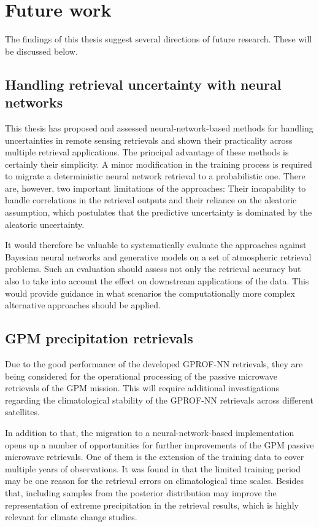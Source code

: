 \section{Future work}

The findings of this thesis suggest several directions of future research.
These will be discussed below.

\subsection{Handling retrieval uncertainty with neural networks}

This thesis has proposed and assessed neural-network-based methods for handling
uncertainties in remote sensing retrievals and shown their practicality across
multiple retrieval applications. The principal advantage of these methods is
certainly their simplicity. A minor modification in the training process is
required to migrate a deterministic neural network retrieval to a probabilistic
one. There are, however, two important limitations of the approaches: Their
incapability to handle correlations in the retrieval outputs and their reliance
on the aleatoric assumption, which postulates that the predictive uncertainty is
dominated by the aleatoric uncertainty.

It would therefore be valuable to systematically evaluate the approaches against
Bayesian neural networks and generative models on a set of atmospheric retrieval
problems. Such an evaluation should assess not only the retrieval accuracy but
also to take into account the effect on downstream applications of the data.
This would provide guidance in what scenarios the computationally more complex
alternative approaches should be applied.

\subsection{GPM precipitation retrievals}

Due to the good performance of the developed GPROF-NN retrievals, they are being
considered for the operational processing of the passive microwave retrievals of
the GPM mission. This will require additional investigations regarding the
climatological stability of the GPROF-NN retrievals across different satellites.

In addition to that, the migration to a neural-network-based implementation
opens up a number of opportunities for further improvements of the GPM passive
microwave retrievals. One of them is the extension of the training data to cover
multiple years of observations. It was found in \citep{pfreundschuh22d} that the
limited training period may be one reason for the retrieval errors on
climatological time scales. Besides that, including samples from the posterior
distribution may improve the representation of extreme precipitation in the
retrieval results, which is highly relevant for climate change studies.

